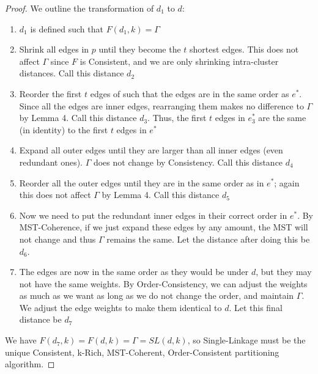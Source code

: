 \begin{proof}
    We outline the transformation of $d_1$ to $d$:
    \begin{enumerate}
        \item $d_1$ is defined such that $F(d_1,k) = \Gamma$
        \item Shrink all edges in $p$ until they become the $t$ shortest edges. This does not affect $\Gamma$ since $F$ is Consistent, and we are only shrinking intra-cluster distances. Call this distance $d_2$
        \item Reorder the first $t$ edges of such that the edges are in the same order as $e^*$. Since all the edges are inner edges, rearranging them makes no difference to $\Gamma$ by Lemma 4. Call this distance $d_3$. Thus, the first $t$ edges in $e^*_3$ are the same (in identity) to the first $t$ edges in $e^*$
        \item Expand all outer edges until they are larger than all inner edges (even redundant ones). $\Gamma$ does not change by Consistency. Call this distance $d_4$
        \item Reorder all the outer edges until they are in the same order as in $e^*$; again this does not affect $\Gamma$ by Lemma 4. Call this distance $d_5$
        \item Now we need to put the redundant inner edges in their correct order in $e^*$. By MST-Coherence, if we just expand these edges by any amount, the MST will not change and thus $\Gamma$ remains the same. Let the distance after doing this be $d_6$.
        \item The edges are now in the same order as they would be under $d$, but they may not have the same weights. By Order-Consistency, we can adjust the weights as much as we want as long as we do not change the order, and maintain $\Gamma$. We adjust the edge weights to make them identical to $d$. Let this final distance be $d_7$
    \end{enumerate}
    
    We have $F(d_7,k) = F(d,k) = \Gamma = SL(d, k)$, so Single-Linkage must be the unique Consistent, k-Rich, MST-Coherent, Order-Consistent partitioning algorithm.
\end{proof}